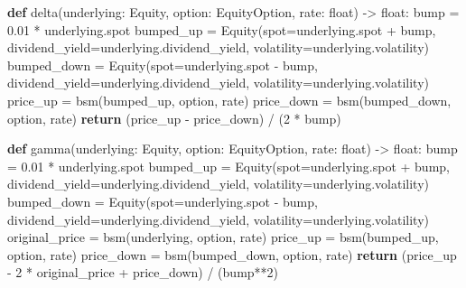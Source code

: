 \documentclass[
  letterpaper,
  DIV=11,
  numbers=noendperiod]{scrartcl}
\newenvironment{Shaded}{\begin{snugshade}}{\end{snugshade}}
\newcommand{\BuiltInTok}[1]{\textcolor[rgb]{0.00,0.23,0.31}{#1}}
\newcommand{\ControlFlowTok}[1]{\textcolor[rgb]{0.00,0.23,0.31}{\textbf{#1}}}
\newcommand{\DecValTok}[1]{\textcolor[rgb]{0.68,0.00,0.00}{#1}}
\newcommand{\FloatTok}[1]{\textcolor[rgb]{0.68,0.00,0.00}{#1}}
\newcommand{\KeywordTok}[1]{\textcolor[rgb]{0.00,0.23,0.31}{\textbf{#1}}}
\newcommand{\NormalTok}[1]{\textcolor[rgb]{0.00,0.23,0.31}{#1}}
\newcommand{\OperatorTok}[1]{\textcolor[rgb]{0.37,0.37,0.37}{#1}}
\begin{document}
\begin{Shaded}
\begin{Highlighting}[]
\KeywordTok{def}\NormalTok{ delta(underlying: Equity, option: EquityOption, rate: }\BuiltInTok{float}\NormalTok{) }\OperatorTok{{-}\textgreater{}} \BuiltInTok{float}\NormalTok{:}
\NormalTok{    bump }\OperatorTok{=} \FloatTok{0.01} \OperatorTok{*}\NormalTok{ underlying.spot}
\NormalTok{    bumped\_up }\OperatorTok{=}\NormalTok{ Equity(spot}\OperatorTok{=}\NormalTok{underlying.spot }\OperatorTok{+}\NormalTok{ bump, }
\NormalTok{                       dividend\_yield}\OperatorTok{=}\NormalTok{underlying.dividend\_yield, }
\NormalTok{                       volatility}\OperatorTok{=}\NormalTok{underlying.volatility)}
\NormalTok{    bumped\_down }\OperatorTok{=}\NormalTok{ Equity(spot}\OperatorTok{=}\NormalTok{underlying.spot }\OperatorTok{{-}}\NormalTok{ bump, }
\NormalTok{                         dividend\_yield}\OperatorTok{=}\NormalTok{underlying.dividend\_yield, }
\NormalTok{                         volatility}\OperatorTok{=}\NormalTok{underlying.volatility)}
\NormalTok{    price\_up }\OperatorTok{=}\NormalTok{ bsm(bumped\_up, option, rate)}
\NormalTok{    price\_down }\OperatorTok{=}\NormalTok{ bsm(bumped\_down, option, rate)}
    \ControlFlowTok{return}\NormalTok{ (price\_up }\OperatorTok{{-}}\NormalTok{ price\_down) }\OperatorTok{/}\NormalTok{ (}\DecValTok{2} \OperatorTok{*}\NormalTok{ bump)}

\KeywordTok{def}\NormalTok{ gamma(underlying: Equity, option: EquityOption, rate: }\BuiltInTok{float}\NormalTok{) }\OperatorTok{{-}\textgreater{}} \BuiltInTok{float}\NormalTok{:}
\NormalTok{    bump }\OperatorTok{=} \FloatTok{0.01} \OperatorTok{*}\NormalTok{ underlying.spot}
\NormalTok{    bumped\_up }\OperatorTok{=}\NormalTok{ Equity(spot}\OperatorTok{=}\NormalTok{underlying.spot }\OperatorTok{+}\NormalTok{ bump, }
\NormalTok{                       dividend\_yield}\OperatorTok{=}\NormalTok{underlying.dividend\_yield, }
\NormalTok{                       volatility}\OperatorTok{=}\NormalTok{underlying.volatility)}
\NormalTok{    bumped\_down }\OperatorTok{=}\NormalTok{ Equity(spot}\OperatorTok{=}\NormalTok{underlying.spot }\OperatorTok{{-}}\NormalTok{ bump, }
\NormalTok{                         dividend\_yield}\OperatorTok{=}\NormalTok{underlying.dividend\_yield, }
\NormalTok{                         volatility}\OperatorTok{=}\NormalTok{underlying.volatility)}
\NormalTok{    original\_price }\OperatorTok{=}\NormalTok{ bsm(underlying, option, rate)}
\NormalTok{    price\_up }\OperatorTok{=}\NormalTok{ bsm(bumped\_up, option, rate)}
\NormalTok{    price\_down }\OperatorTok{=}\NormalTok{ bsm(bumped\_down, option, rate)}
    \ControlFlowTok{return}\NormalTok{ (price\_up }\OperatorTok{{-}} \DecValTok{2} \OperatorTok{*}\NormalTok{ original\_price }\OperatorTok{+}\NormalTok{ price\_down) }\OperatorTok{/}\NormalTok{ (bump}\OperatorTok{**}\DecValTok{2}\NormalTok{)}


\end{Highlighting}
\end{Shaded}
\end{document}
